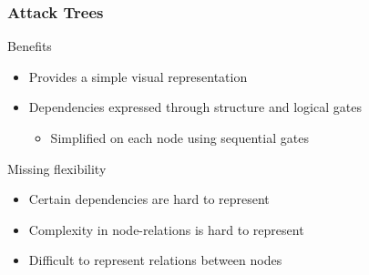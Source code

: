 

\begin{frame}\frametitle{Attack Trees}
  \begin{block}{Benefits}
    \begin{itemize}
      \item Provides a simple visual representation
      \item Dependencies expressed through structure and logical gates
      \begin{itemize}
        \item Simplified on each node using sequential gates
      \end{itemize}
    \end{itemize}
  \end{block}
  \begin{block}{Missing flexibility}
    \begin{itemize}
      \item Certain dependencies are hard to represent
      \item Complexity in node-relations is hard to represent
      \item Difficult to represent relations between nodes
    \end{itemize}
  \end{block}
\end{frame}





